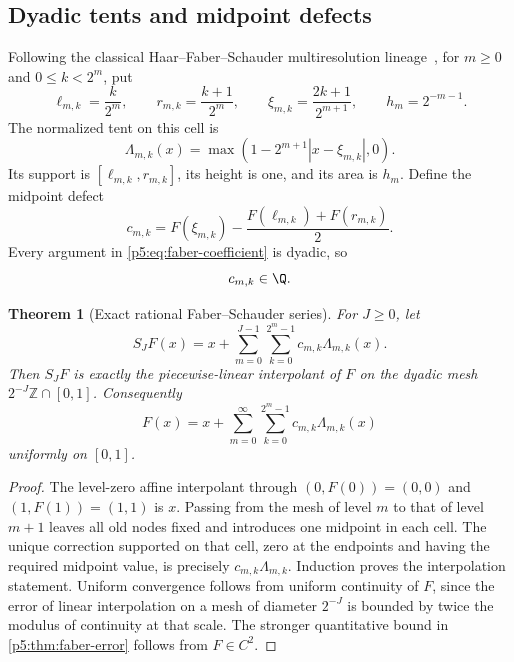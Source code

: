 \documentclass[11pt,oneside]{article}
\newtheorem{theorem}{Theorem}[section]
\theoremstyle{definition}
\newcommand{\Z}{\mathbb Z}
\begin{document}
\subsection{Dyadic tents and midpoint defects}

Following the classical Haar--Faber--Schauder multiresolution lineage~\cite{p5:haar1910,p5:faber1910,p5:schauder1928,p5:deboor2001}, for $m\ge0$ and $0\le k<2^m$, put
\begin{equation}
 \ell_{m,k}=\frac{k}{2^m},\qquad
 r_{m,k}=\frac{k+1}{2^m},\qquad
 \xi_{m,k}=\frac{2k+1}{2^{m+1}},\qquad
 h_m=2^{-m-1}.                                           \label{p5:eq:faber-cell}
\end{equation}
The normalized tent on this cell is
\begin{equation}
 \Lambda_{m,k}(x)=
 \max\!\left(1-2^{m+1}|x-\xi_{m,k}|,0\right).            \label{p5:eq:faber-tent}
\end{equation}
Its support is $[\ell_{m,k},r_{m,k}]$, its height is one,
and its area is $h_m$.  Define the midpoint defect
\begin{equation}
 c_{m,k}=F(\xi_{m,k})-\frac{F(\ell_{m,k})+F(r_{m,k})}{2}. \label{p5:eq:faber-coefficient}
\end{equation}
Every argument in \eqref{p5:eq:faber-coefficient} is dyadic, so
\begin{equation}
 c_{m,k}\in\Q.                                           \label{p5:eq:faber-rational}
\end{equation}

\begin{theorem}[Exact rational Faber--Schauder series]
\label{p5:thm:faber-series}
For $J\ge0$, let
\begin{equation}
 S_JF(x)=x+\sum_{m=0}^{J-1}\sum_{k=0}^{2^m-1}
              c_{m,k}\Lambda_{m,k}(x).                   \label{p5:eq:faber-partial}
\end{equation}
Then $S_JF$ is exactly the piecewise-linear interpolant of $F$ on the dyadic
mesh $2^{-J}\Z\cap[0,1]$.  Consequently
\begin{equation}
 \boxed{\displaystyle
 F(x)=x+\sum_{m=0}^\infty\sum_{k=0}^{2^m-1}
 c_{m,k}\Lambda_{m,k}(x)}                               \label{p5:eq:faber-series}
\end{equation}
uniformly on $[0,1]$.
\end{theorem}

\begin{proof}
The level-zero affine interpolant through $(0,F(0))=(0,0)$ and
$(1,F(1))=(1,1)$ is $x$.  Passing from the mesh of level $m$ to that of level
$m+1$ leaves all old nodes fixed and introduces one midpoint in each cell.
The unique correction supported on that cell, zero at the endpoints and
having the required midpoint value, is precisely
$c_{m,k}\Lambda_{m,k}$.  Induction proves the interpolation statement.
Uniform convergence follows from uniform continuity of $F$, since the error
of linear interpolation on a mesh of diameter $2^{-J}$ is bounded by twice
the modulus of continuity at that scale.  The stronger quantitative bound in
\cref{p5:thm:faber-error} follows from $F\in C^2$.
\end{proof}
\end{document}
